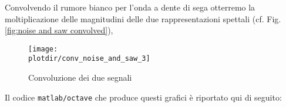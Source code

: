 Convolvendo il rumore bianco per l'onda a dente di sega otterremo la
moltiplicazione delle magnitudini delle due rappresentazioni spettali (cf.
Fig.\vref{fig:noise and saw convolved}),

\begin{figure}[hbt]
  \begin{center}
	  \texttt{[image: \\plotdir/conv\_noise\_and\_saw\_3]}
  \end{center}
	\caption{Convoluzione dei due segnali\label{fig:noise and saw convolved}}
\end{figure}

Il codice {\tt matlab/octave} che produce questi grafici \`e riportato qui di
seguito:


